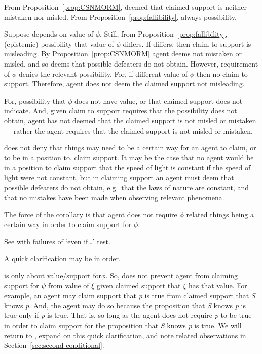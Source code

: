 \begin{note}[\eiS{}]
  From Proposition~\ref{prop:CSNMORM}, deemed that claimed support is neither mistaken nor misled.
  From Proposition~\ref{prop:fallibility}, always possibility.

  Suppose depends on value of \(\phi\).
  Still, from Proposition~\ref{prop:fallibility}, (epistemic) possibility that value of \(\phi\) differs.
  If differs, then claim to support is misleading.
  By Proposition~\ref{prop:CSNMORM} agent deems not mistaken or misled, and so deems that possible defeaters do not obtain.
  However, requirement of \(\phi\) denies the relevant possibility.
  For, if different value of \(\phi\) then no claim to support.
  Therefore, agent does not deem the claimed support not misleading.


  For, possibility that \(\phi\) does not have value, or that claimed support does not indicate.
  And, given claim to support requires that the possibility does not obtain, agent has not deemed that the claimed support is not misled or mistaken --- rather the agent requires that the claimed support is not misled or mistaken.

  \eiS{} does not deny that things may need to be a certain way for an agent to claim, or to be in a position to, claim support.
  It may be the case that no agent would be in a position to claim support that the speed of light is constant if the speed of light were not constant, but in claiming support an agent must deem that possible defeaters do not obtain, e.g.\ that the laws of nature are constant, and that no mistakes have been made when observing relevant phenomena.

  The force of the corollary is that agent does not require \(\phi\) related things being a certain way in order to claim support for \(\phi\).

  See with failures of `even if\dots' test.
\end{note}

\begin{note}
  A quick clarification may be in order.

  \eiS{} is only about value/support for\(\phi\).
  So, \eiS{} does not prevent agent from claiming support for \(\psi\) from value of \(\xi\) given claimed support that \(\xi\) has that value.
  For example, an agent may claim support that \emph{p} is true from claimed support that \emph{S} knows \emph{p}.
  And, the agent may do so because the proposition that \emph{S} knows \emph{p} is true only if \emph{p} is true.
  That is, so long as the agent does not require \emph{p} to be true in order to claim support for the proposition that \emph{S} knows \emph{p} is true.
  We will return to \eiS{}, expand on this quick clarification, and note related observations in Section~\ref{sec:second-conditional}.
\end{note}


